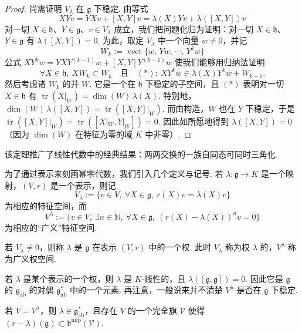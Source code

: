 \begin{numpara}[表示论刻画]
\begin{proof}
尚需证明 $V_{\lambda}$ 在 $\mathfrak g$ 下稳定. 由等式
\[
XYv=YXv+[X,Y]v=\lambda(X)Yv+\lambda([X,Y])v
\]
对一切 $X\in\mathfrak h$、$Y\in\mathfrak g$、$v\in V_{\lambda}$ 成立，我们把问题化归为证明：对一切 $X\in\mathfrak h$、$Y\in\mathfrak g$ 有 $\lambda([X,Y])=0$. 为此，取定 $V_{\lambda}$ 中一个向量 $w\neq 0$，并记
\[
W_{k}:=\operatorname{vect}\{w,\,Yw,\,\cdots,\,Y^{k}w\}
\]
公式 $XY^{k}w=YXY^{(k-1)}w+[X,Y]Y^{(k-1)}w$ 使我们能够用归纳法证明
\[
\forall X\in\mathfrak h,\ XW_{k}\subset W_{k}\quad\text{且}\quad(\ast):\ XY^{k}w\in\lambda(X)Y^{k}w+W_{k-1}.
\]
然后考虑诸 $W_{k}$ 的并 $W$. 它是一个在 $\mathfrak h$ 下稳定的子空间，且 $(\ast)$ 表明对一切 $X\in\mathfrak h$ 有 $\operatorname{tr}(X|_{W})=\dim(W)\,\lambda(X)$. 特别地，$\dim(W)\,\lambda([X,Y])=\operatorname{tr}([X,Y]|_{W})$. 而由构造，$W$ 也在 $Y$ 下稳定，于是 $\operatorname{tr}([X,Y]|_{W})=\operatorname{tr}([X|_{W},Y|_{W}])=0$. 因此如所愿地得到 $\lambda([X,Y])=0$（因为 $\dim(W)$ 在特征为零的域 $K$ 中非零）.
\end{proof}
\begin{remark*}
该定理推广了线性代数中的经典结果：两两交换的一族自同态可同时三角化.
\end{remark*}
为了通过表示来刻画幂零代数，我们引入几个定义与记号. 若 $\lambda:\mathfrak g\longrightarrow K$ 是一个映射，$(V,r)$ 是一个表示，则记
\[
V_{\lambda}:=\{v\in V,\ \forall X\in\mathfrak g,\ r(X)v=\lambda(X)v\}
\]
为相应的特征空间，而
\[
V^{\lambda}:=\{v\in V,\ \exists n\in\mathbb N,\ \forall X\in\mathfrak g,\ (r(X)-\lambda(X))^{n}v=0\}
\]
为相应的``广义''特征空间.
\begin{definition*}
若 $V_{\lambda}\neq 0$，则称 $\lambda$ 是 $\mathfrak g$ 在表示 $(V,r)$ 中的一个权. 此时 $V_{\lambda}$ 称为权 $\lambda$ 的，$V^{\lambda}$ 称为广义权空间.
\end{definition*}
\begin{exercise*}
若 $\lambda$ 是某个表示的一个权，则 $\lambda$ 是 $K$-线性的，且 $\lambda([\mathfrak g,\mathfrak g])=0$. 因此它是 $\mathfrak g$ 的 $\mathfrak g_{\mathrm{ab}}$ 的对偶 $\mathfrak g_{\mathrm{ab}}^{*}$ 中的一个元素.
再注意，一般说来并不清楚 $V^{\lambda}$ 是否在 $\mathfrak g$ 下稳定.
\end{exercise*}
\begin{proposition*}[Engel 定理]
若 $V=V^{\lambda}$，则 $\lambda\in\mathfrak g_{\mathrm{ab}}^{*}$，且存在 $V$ 的一个完全旗 $\mathcal V$ 使得 $(r-\lambda)(\mathfrak g)\subset\mathfrak b^{\mathrm{nilp}}(\mathcal V)$.
\end{proposition*}

\end{numpara}
